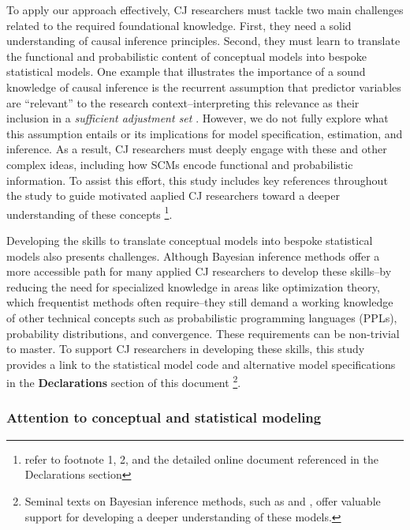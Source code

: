 \documentclass[
  authoryear,
  review,
  1p]{elsarticle}
\begin{document}
To apply our approach effectively, CJ researchers must tackle two main
challenges related to the required foundational knowledge. First, they
need a solid understanding of causal inference principles. Second, they
must learn to translate the functional and probabilistic content of
conceptual models into bespoke statistical models. One example that
illustrates the importance of a sound knowledge of causal inference is
the recurrent assumption that predictor variables are ``relevant'' to
the research context--interpreting this relevance as their inclusion in
a \emph{sufficient adjustment set}
\citep{Pearl_2009, Pearl_et_al_2016, Morgan_et_al_2014}. However, we do
not fully explore what this assumption entails or its implications for
model specification, estimation, and inference. As a result, CJ
researchers must deeply engage with these and other complex ideas,
including how SCMs encode functional and probabilistic information. To
assist this effort, this study includes key references throughout the
study to guide motivated aaplied CJ researchers toward a deeper
understanding of these concepts \footnote{refer to footnote 1, 2, and
  the detailed online document referenced in the Declarations section}.

Developing the skills to translate conceptual models into bespoke
statistical models also presents challenges. Although Bayesian inference
methods offer a more accessible path for many applied CJ researchers to
develop these skills--by reducing the need for specialized knowledge in
areas like optimization theory, which frequentist methods often
require--they still demand a working knowledge of other technical
concepts such as probabilistic programming languages (PPLs), probability
distributions, and convergence. These requirements can be non-trivial to
master. To support CJ researchers in developing these skills, this study
provides a link to the statistical model code and alternative model
specifications in the \textbf{Declarations} section of this document
\footnote{Seminal texts on Bayesian inference methods, such as
  \citet{Gelman_et_al_2014} and \citet{McElreath_2020}, offer valuable
  support for developing a deeper understanding of these models.}.

\subsubsection{Attention to conceptual and statistical
modeling}\label{sec-discussion_challenges2}
\end{document}
